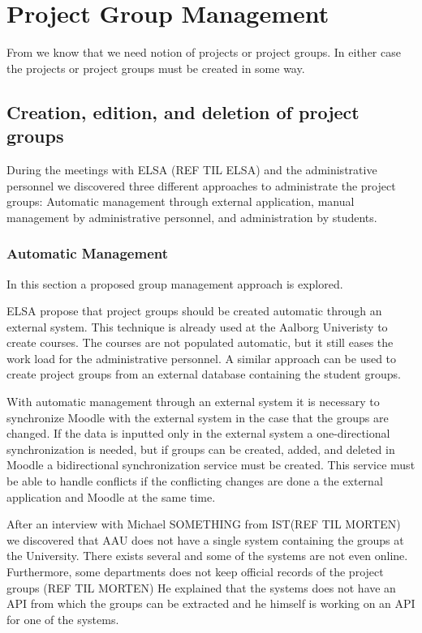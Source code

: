 \section{Project Group Management}
\label{sec:groupManagement}
From  we know that we need notion of projects or project groups. In either case the projects or project groups must be created in some way. 

\subsection{Creation, edition, and deletion of project groups} %
During the meetings with ELSA (REF TIL ELSA) and the administrative personnel we discovered three different approaches to administrate the project groups: Automatic management through external application, manual management by administrative personnel, and administration by students. 


\subsubsection{Automatic Management}
In this section a proposed group management approach is explored.  

ELSA propose that project groups should be created automatic through an external system. 
This technique is already used at the Aalborg Univeristy to create courses. 
The courses are not populated automatic, but it still eases the work load for the administrative personnel.  
A similar approach can be used to create project groups from an external database containing the student groups. 

With automatic management through an external system it is necessary to synchronize Moodle with the external system in the case that the groups are changed. 
If the data is inputted only in the external system a one-directional synchronization is needed, but if groups can be created, added, and deleted in Moodle a bidirectional synchronization service must be created. 
This service must be able to handle conflicts if the conflicting changes are done a the external application and Moodle at the same time.

After an interview with Michael SOMETHING from IST(REF TIL MORTEN) we discovered that AAU does not have a single system containing the groups at the University.
There exists several and some of the systems are not even online.
Furthermore, some departments does not keep official records of the project groups (REF TIL MORTEN)
He explained that the systems does not have an API from which the groups can be extracted and he himself is working on an API for one of the systems.

